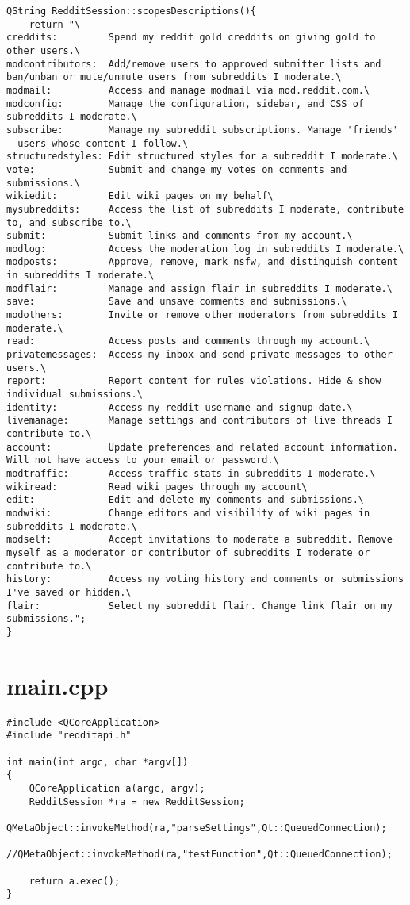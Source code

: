 \documentclass[12pt]{article}
\begin{document}
\begin{verbatim}
QString RedditSession::scopesDescriptions(){
	return "\
creddits:         Spend my reddit gold creddits on giving gold to other users.\
modcontributors:  Add/remove users to approved submitter lists and ban/unban or mute/unmute users from subreddits I moderate.\
modmail:          Access and manage modmail via mod.reddit.com.\
modconfig:        Manage the configuration, sidebar, and CSS of subreddits I moderate.\
subscribe:        Manage my subreddit subscriptions. Manage 'friends' - users whose content I follow.\
structuredstyles: Edit structured styles for a subreddit I moderate.\
vote:             Submit and change my votes on comments and submissions.\
wikiedit:         Edit wiki pages on my behalf\
mysubreddits:     Access the list of subreddits I moderate, contribute to, and subscribe to.\
submit:           Submit links and comments from my account.\
modlog:           Access the moderation log in subreddits I moderate.\
modposts:         Approve, remove, mark nsfw, and distinguish content in subreddits I moderate.\
modflair:         Manage and assign flair in subreddits I moderate.\
save:             Save and unsave comments and submissions.\
modothers:        Invite or remove other moderators from subreddits I moderate.\
read:             Access posts and comments through my account.\
privatemessages:  Access my inbox and send private messages to other users.\
report:           Report content for rules violations. Hide & show individual submissions.\
identity:         Access my reddit username and signup date.\
livemanage:       Manage settings and contributors of live threads I contribute to.\
account:          Update preferences and related account information. Will not have access to your email or password.\
modtraffic:       Access traffic stats in subreddits I moderate.\
wikiread:         Read wiki pages through my account\
edit:             Edit and delete my comments and submissions.\
modwiki:          Change editors and visibility of wiki pages in subreddits I moderate.\
modself:          Accept invitations to moderate a subreddit. Remove myself as a moderator or contributor of subreddits I moderate or contribute to.\
history:          Access my voting history and comments or submissions I've saved or hidden.\
flair:            Select my subreddit flair. Change link flair on my submissions.";
}

\end{verbatim}

\clearpage
\section{main.cpp}
\begin{verbatim}
#include <QCoreApplication>
#include "redditapi.h"

int main(int argc, char *argv[])
{
	QCoreApplication a(argc, argv);
	RedditSession *ra = new RedditSession;
	QMetaObject::invokeMethod(ra,"parseSettings",Qt::QueuedConnection);
	//QMetaObject::invokeMethod(ra,"testFunction",Qt::QueuedConnection);

	return a.exec();
}

\end{verbatim}
\end{document}
